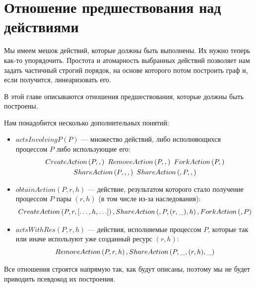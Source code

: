 \section{Отношение предшествования над действиями}
\label{chap2:sec:preced}

Мы имеем мешок действий, которые должны быть выполнены. Их нужно теперь как-то упорядочить. Простота и атомарность выбранных действий позволяет нам задать частичный строгий порядок, на основе которого потом построить граф и, если получится, линеаризовать его.

В этой главе описываются отношения предшествования, которые должны быть построены.

Нам понадобится несколько дополнительных понятий:

\begin{itemize}
	\item $actsInvolvingP(P)$ --- множество действий, либо исполняющихся процессом $P$ либо использующие его:
\begin{gather*}
	CreateAction\left( P, ,  \right)\ RemoveAction\left( P, ,  \right)\ ForkAction\left( P,  \right) \\
	ShareAction\left( P, , ,  \right)\ ShareAction\left( , P, ,  \right)
\end{gather*}

	\item $obtainAction(P, r, h)$ --- действие, результатом которого стало получение процессом $P$ пары $(r, h)$ (в том числе из-за наследования):
	\begin{equation*}
		CreateAction\left( P, r, [\ldots, h, \ldots] \right), ShareAction\left( , P, (r, \_), h \right), ForkAction\left( , P \right)
	\end{equation*}

	\item $actsWithRes(P, r, h)$ --- действия, исполняемые процессом $P$, которые так или иначе используют уже созданный ресурс $(r, h)$:
	\begin{equation*}
		RemoveAction\left( P, r, h \right), ShareAction\left( P, \_, (r, h), \_ \right)
	\end{equation*}
\end{itemize}

Все отношения строятся напрямую так, как будут описаны, поэтому мы не будет приводить псевдокод их построения.

